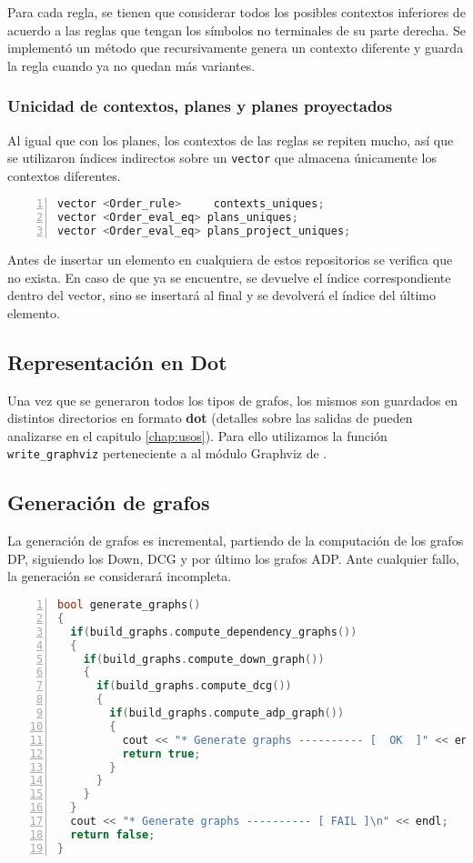 Para cada regla, se tienen que considerar todos los posibles contextos inferiores de acuerdo a las reglas que tengan los símbolos no terminales de su parte derecha. Se implementó un método que recursivamente genera un contexto diferente y guarda la regla cuando ya no quedan más variantes.

\subsubsection{Unicidad de contextos, planes y planes proyectados}

Al igual que con los planes, los contextos de las reglas se repiten mucho, así que se utilizaron índices indirectos sobre un \texttt{vector} que almacena únicamente los contextos diferentes.

\begin{lstlisting}[language=C++, basicstyle=\scriptsize, numbers=left, columns=fullflexible, linewidth=8cm]
vector <Order_rule>     contexts_uniques;
vector <Order_eval_eq> plans_uniques;
vector <Order_eval_eq> plans_project_uniques;
\end{lstlisting}

Antes de insertar un elemento en cualquiera de estos repositorios se verifica que no exista. En caso de que ya se encuentre, se devuelve el índice correspondiente dentro del vector, sino se insertará al final y se devolverá el índice del último elemento.

\subsection{Representación en Dot}

Una vez que se generaron todos los tipos de grafos, los mismos son guardados en distintos directorios en formato \textbf{dot}\cite{dot} (detalles sobre las salidas de \maggen pueden analizarse en el capitulo \ref{chap:usos}). Para ello utilizamos la función \texttt{write\_graphviz} perteneciente a al módulo Graphviz de \boost.

\subsection{Generación de grafos}

La generación de grafos es incremental, partiendo de la computación de los grafos DP, siguiendo los Down, DCG y por último los grafos ADP. Ante cualquier fallo, la generación se considerará incompleta.

\begin{lstlisting}[language=C++, basicstyle=\scriptsize, numbers=left, columns=fullflexible, linewidth=10.5cm]
bool generate_graphs()
{
  if(build_graphs.compute_dependency_graphs())
  {
    if(build_graphs.compute_down_graph())
    {
      if(build_graphs.compute_dcg())
      {
        if(build_graphs.compute_adp_graph())
        {
          cout << "* Generate graphs ---------- [  OK  ]" << endl;
          return true;
        }
      }
    }
  }
  cout << "* Generate graphs ---------- [ FAIL ]\n" << endl;
  return false;
}
\end{lstlisting}
\vspace{0.3cm}


